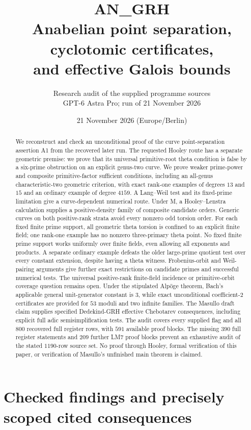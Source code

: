 \documentclass[11pt,a4paper]{article}
\title{\textbf{AN\_GRH}\\[7pt]Anabelian point separation, cyclotomic certificates,\\and effective Galois bounds}
\author{Research audit of the supplied programme sources\\GPT-6 Astra Pro; run of 21 November 2026}
\date{21 November 2026 (Europe/Berlin)}
\begin{document}
\maketitle
\begin{abstract}
We reconstruct and check an unconditional proof of the curve point-separation
assertion A1 from the recovered later run. The requested Hooley route has a
separate geometric premise: we prove that its universal primitive-root theta
condition is false by a six-prime obstruction on an explicit genus-two curve.
We prove weaker prime-power and composite primitive-factor sufficient
conditions, including an all-genus characteristic-two geometric criterion,
with exact rank-one examples of degrees $13$ and $15$ and an
ordinary example of degree $4159$. A Lang--Weil test and its fixed-prime
limitation give a curve-dependent numerical route. Under M, a Hooley--Lenstra
calculation supplies a positive-density family of composite candidate orders.
Generic curves on both positive-rank strata avoid every nonzero odd torsion
order. For each fixed finite prime support, all geometric theta torsion is
confined to an explicit finite field; one rank-one example has no nonzero
three-primary theta point. No fixed finite prime support works uniformly over
finite fields, even allowing all exponents and products. A separate ordinary
example defeats the older large-prime quotient test over every constant
extension, despite having a theta witness. Frobenius-orbit and Weil-pairing
arguments give further exact restrictions on candidate primes and successful
numerical tests. The universal
positive-rank finite-field incidence or primitive-orbit coverage question
remains open.
Under the stipulated Alp\"oge theorem, Bach's applicable general unit-generator
constant is $3$, while exact unconditional coefficient-$2$ certificates are
provided for $53$ moduli and two infinite families. The Masullo draft claim
supplies specified Dedekind-GRH effective Chebotarev consequences, including
explicit full adic semisimplification tests. The audit covers every supplied
flag and all $800$ recovered full register rows, with $591$ available proof
blocks. The missing $390$ full register statements and $209$ further LM7
proof blocks prevent an exhaustive audit of the stated $1190$-row source set.
No proof through Hooley, formal verification of this paper, or verification
of Masullo's unfinished main theorem is claimed.
\end{abstract}
\tableofcontents
\clearpage
\part{Checked findings and precisely scoped cited consequences}
\end{document}
